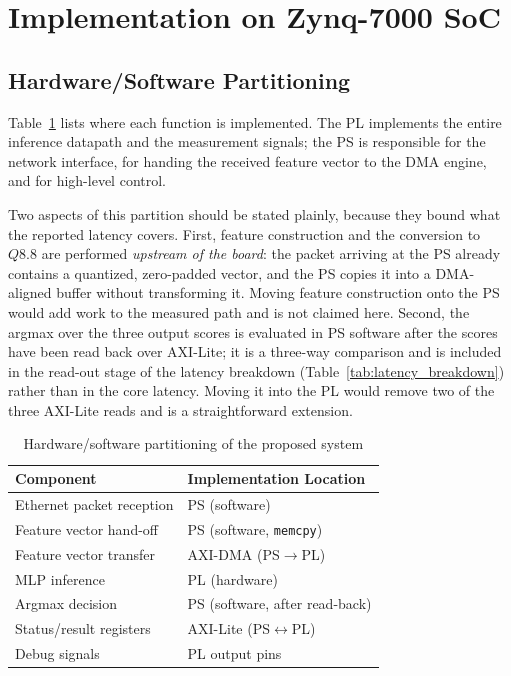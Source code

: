 \documentclass[final,5p,times,twocolumn]{elsarticle}
\begin{document}
\section{Implementation on Zynq-7000 SoC}

\subsection{Hardware/Software Partitioning}
Table~\ref{tab:hw_sw_partitioning} lists where each function is implemented.
The PL implements the entire inference datapath and the measurement signals; the
PS is responsible for the network interface, for handing the received feature
vector to the DMA engine, and for high-level control.

Two aspects of this partition should be stated plainly, because they bound what
the reported latency covers. First, feature construction and the conversion to
$Q8.8$ are performed \emph{upstream of the board}: the packet arriving at the PS
already contains a quantized, zero-padded vector, and the PS copies it into a
DMA-aligned buffer without transforming it. Moving feature construction onto the
PS would add work to the measured path and is not claimed here. Second, the
argmax over the three output scores is evaluated in PS software after the scores
have been read back over AXI-Lite; it is a three-way comparison and is included
in the read-out stage of the latency breakdown
(Table~\ref{tab:latency_breakdown}) rather than in the core latency. Moving it
into the PL would remove two of the three AXI-Lite reads and is a
straightforward extension.

\begin{table}[t]
\centering
\caption{Hardware/software partitioning of the proposed system}
\label{tab:hw_sw_partitioning}
\begin{tabular}{p{2.8cm} p{4.6cm}}
\toprule
Component & Implementation Location \\
\midrule
Ethernet packet reception & PS (software) \\
Feature vector hand-off & PS (software, \texttt{memcpy}) \\
Feature vector transfer & AXI-DMA (PS$\rightarrow$PL) \\
MLP inference & PL (hardware) \\
Argmax decision & PS (software, after read-back) \\
Status/result registers & AXI-Lite (PS$\leftrightarrow$PL) \\
Debug signals & PL output pins \\
\bottomrule
\end{tabular}
\end{table}
\end{document}
